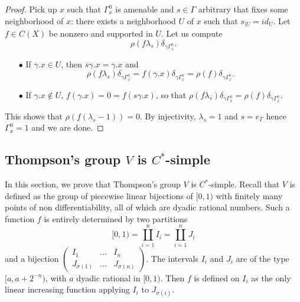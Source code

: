 \begin{proof}
Pick up $x$ such that $\Gamma^0_x$ is amenable and $s\in \Gamma$ arbitrary that fixes some neighborhood of $x$: there exists a neighborhood $U$ of $x$ such that $s_{|U}= id_{U}$. Let $f\in C(X)$ be nonzero and supported in $U$. Let us compute 
\[\rho(f\lambda_s)\delta_{\gamma\Gamma^0_x}.\]
\begin{itemize}
\item[$\bullet$] If $\gamma .x \in U$, then $s\gamma . x = \gamma . x$ and 
\[\rho(f\lambda_s)\delta_{\gamma\Gamma^0_x} = f(\gamma . x)\delta_{\gamma \Gamma^0_x} = \rho(f)\delta_{\gamma\Gamma^0_x}.\]  
\item[$\bullet$] If $\gamma .x \notin U$, $f(\gamma . x) = 0 = f( s \gamma . x)$, so that $\rho(f\lambda_s)\delta_{\gamma\Gamma^0_x} =\rho(f)\delta_{\gamma\Gamma^0_x}$.\\
\end{itemize}
This shows that $\rho(f (\lambda_s - 1)) = 0$. By injectivity, $\lambda_s = 1$ and $s=e_\Gamma$ hence $\Gamma^0_x=1$ and we are done.
\end{proof}

\subsection{Thompson's group $V$ is $C^*$-simple}

In this section, we prove that Thompson's group $V$ is $C^*$-simple. Recall that $V$ is defined as the group of piecewise linear bijections of $[0,1)$ with finitely many points of non differentiability, all of which are dyadic rational numbers. Such a function $f$ is entirely determined by two partitions 
\[[0, 1 ) = \coprod_{i=1}^n I_i = \coprod_{i=1}^n J_i\]
and a bijection $\begin{pmatrix} I_1 & ... & I_n \\ J_{\sigma(1)} & ... & J_{\sigma(n)}\end{pmatrix}$. The intervals $I_i$ and $J_i$ are of the type $[a,a+2^{-n})$, with $a$ dyadic rational in $[0,1)$. Then $f$ is defined on $I_i$ as the only linear increasing function applying $I_i$ to $J_{\sigma(i)}$.\\

